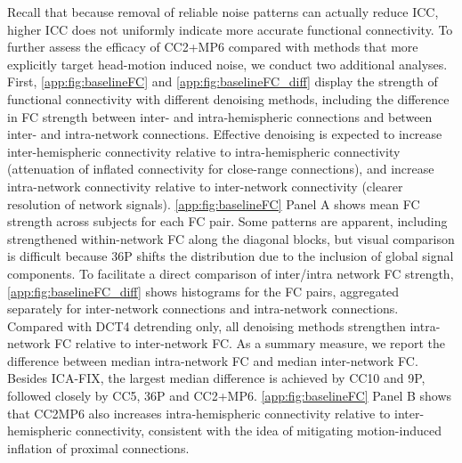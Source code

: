 \documentclass{article}
\begin{document}
Recall that because removal of reliable noise patterns can actually reduce ICC, higher ICC does not uniformly indicate more accurate functional connectivity. To further assess the efficacy of CC2+MP6 compared with methods that more explicitly target head-motion induced noise, we conduct two additional analyses. First, \autoref{app:fig:baselineFC} and \autoref{app:fig:baselineFC_diff} display the strength of functional connectivity with different denoising methods, including the difference in FC strength between inter- and intra-hemispheric connections and between inter- and intra-network connections.  Effective denoising is expected to increase inter-hemispheric connectivity relative to intra-hemispheric connectivity (attenuation of inflated connectivity for close-range connections), and increase intra-network connectivity relative to inter-network connectivity (clearer resolution of network signals). \autoref{app:fig:baselineFC} Panel A shows mean FC strength across subjects for each FC pair. Some patterns are apparent, including strengthened within-network FC along the diagonal blocks, but visual comparison is difficult because 36P shifts the distribution due to the inclusion of global signal components. To facilitate a direct comparison of inter/intra network FC strength, \autoref{app:fig:baselineFC_diff} shows histograms for the FC pairs, aggregated separately for inter-network connections and intra-network connections. Compared with DCT4 detrending only, all denoising methods strengthen intra-network FC relative to inter-network FC. As a summary measure, we report the difference between median intra-network FC and median inter-network FC.  Besides ICA-FIX, the largest median difference is achieved by CC10 and 9P, followed closely by CC5, 36P and CC2+MP6. \autoref{app:fig:baselineFC} Panel B shows that CC2MP6 also increases intra-hemispheric connectivity relative to inter-hemispheric connectivity, consistent with the idea of mitigating motion-induced inflation of proximal connections.
\end{document}
